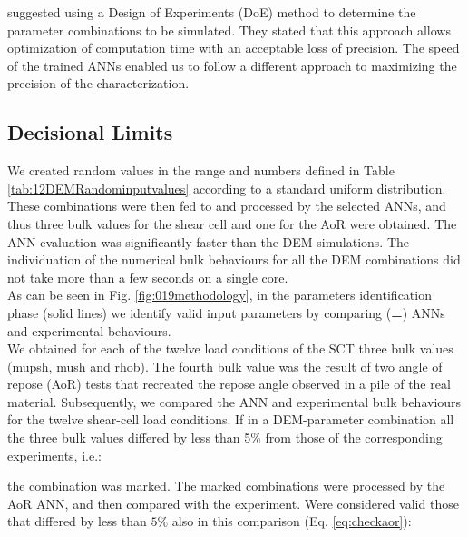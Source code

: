 \citet{RefWorks:116, RefWorks:160} suggested using a Design of Experiments
(\acs{DoE}) method to determine the parameter combinations to be simulated.
They stated that this approach allows optimization of computation time
with an acceptable loss of precision.
The speed of the trained \acs{ANNs} enabled us to follow a different approach to
maximizing the precision of the characterization.\\



\subsection{Decisional Limits}
\label{subsec:decisionallimits}

We created random values
in the range and numbers defined in Table \ref{tab:12DEMRandominputvalues}
according to a standard uniform distribution.
These combinations were then fed to and processed by the selected
\acs{ANNs}, and thus three bulk values for the shear
cell and one for the \acs{AoR} were obtained.
The \acs{ANN} evaluation was significantly faster than the \acs{DEM} simulations. The
individuation of the numerical bulk behaviours for all the \acs{DEM} combinations
did not take more than a few seconds on a single core.\\

As can be seen in Fig. \ref{fig:019methodology}, in the parameters
identification phase (solid lines) we identify valid input parameters by comparing (\textbf{=}) \acs{ANNs} and
experimental behaviours.\\
We obtained for each of the twelve load conditions of the \acs{SCT} three bulk
values (\acs{mupsh}, \acs{mush} and \acs{rhob}).
The fourth bulk value was the result of two angle of repose (\acs{AoR}) tests that
recreated the repose angle observed in a pile of the
real material. 
Subsequently, we compared the \acs{ANN} and experimental bulk behaviours for the
twelve shear-cell load conditions.
If in a DEM-parameter combination all the three bulk values differed by less 
than 5\% from those of the corresponding experiments, i.e.:

the combination was marked. The marked combinations were processed by the
\acs{AoR} \acs{ANN}, and then compared with the experiment.
Were considered valid those that differed by less than $5\%$ also in this
comparison (Eq. \ref{eq:checkaor}):


